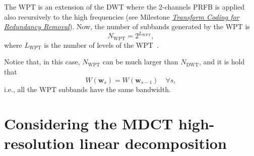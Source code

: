 The WPT is an extension of the DWT where the 2-channels PRFB is
applied also recursively to the high frequencies (see Milestone
\href{https://tecnologias-multimedia.github.io/contents/transform_coding/}{\emph{Transform
  Coding for Redundancy Removal}}). Now, the number of subbands
  generated by the WPT is
\begin{equation}
  N_{\text{WPT}} = 2^{L_{\text{WPT}}},
\end{equation}
where $L_\text{WPT}$ is the number of levels of the
WPT~\cite{vetterli1995wavelets}.

Notice that, in this case, $N_{\text{WPT}}$ can be
much larger than $N_{\text{DWT}}$, and it is hold that
\begin{equation}
  W({\mathbf w}_s) = W({\mathbf w}_{s-1})\quad \forall s,
\end{equation}
i.e., all the WPT subbands have the same bandwidth.

\section{Considering the MDCT high-resolution linear decomposition}



